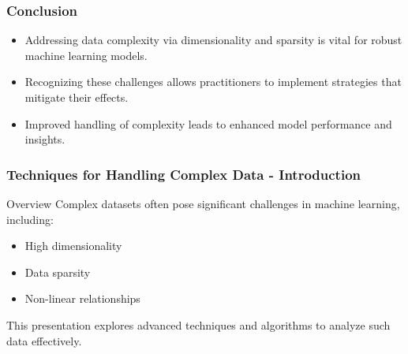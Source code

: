 \documentclass[aspectratio=169]{beamer}
\begin{document}
\begin{frame}[fragile]
    \frametitle{Conclusion}
    \begin{itemize}
        \item Addressing data complexity via dimensionality and sparsity is vital for robust machine learning models.
        \item Recognizing these challenges allows practitioners to implement strategies that mitigate their effects.
        \item Improved handling of complexity leads to enhanced model performance and insights.
    \end{itemize}
\end{frame}

\begin{frame}[fragile]
    \frametitle{Techniques for Handling Complex Data - Introduction}
    \begin{block}{Overview}
        Complex datasets often pose significant challenges in machine learning, including:
        \begin{itemize}
            \item High dimensionality
            \item Data sparsity
            \item Non-linear relationships
        \end{itemize}
        This presentation explores advanced techniques and algorithms to analyze such data effectively.
    \end{block}
\end{frame}
\end{document}
